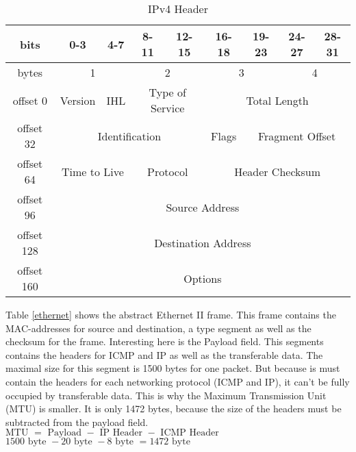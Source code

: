 \begin{table}[H]
	\centering
	\label{ipv4-header}
	\begin{tabular}{|c|c|c|c|c|c|c|c|c|}
		\hline
		bits       & 0-3               & 4-7           & 8-11             & 12-15             & 16-18  & 19-23      & 24-27      & 28-31      \\ \hline
		bytes                            & \multicolumn{2}{c|}{1}                                              & \multicolumn{2}{c|}{2}                                               & \multicolumn{2}{c|}{3}& \multicolumn{2}{c|}{4}\\ \hline
		offset 0   & Version           & IHL           & \multicolumn{2}{c|}{Type of Service} & \multicolumn{4}{c|}{Total Length}             \\ \hline
		offset 32  & \multicolumn{4}{c|}{Identification}                                      & Flags  & \multicolumn{3}{c|}{Fragment Offset} \\ \hline
		offset 64  & \multicolumn{2}{c|}{Time to Live} & \multicolumn{2}{c|}{Protocol}        & \multicolumn{4}{c|}{Header Checksum}          \\ \hline
		offset 96  & \multicolumn{8}{c|}{Source Address}                                                                                      \\ \hline
		offset 128 & \multicolumn{8}{c|}{Destination Address}                                                                                 \\ \hline
		offset 160 & \multicolumn{8}{c|}{Options}                                                                                             \\ \hline
	\end{tabular}
	\caption{IPv4 Header}
\end{table}

Table \ref{ethernet} shows the abstract Ethernet II frame. This frame contains the MAC-addresses for source and destination, a type segment as well as the checksum for the frame. Interesting here is the Payload field. This segments contains the headers for ICMP and IP as well as the transferable data. The maximal size for this segment is 1500 bytes for one packet. But because is must contain the headers for each networking protocol (ICMP and IP), it can't be fully occupied by transferable data. This is why the Maximum Transmission Unit (MTU) is smaller. It is only 1472 bytes, because the size of the headers must be subtracted from the payload field.
$ \text{MTU } = \text{ Payload } - \text{ IP Header } - \text{ ICMP Header }$\\
$ 1500\text{ byte } - 20 \text{ byte } - 8 \text{ byte } = 1472 \text{ byte }$

